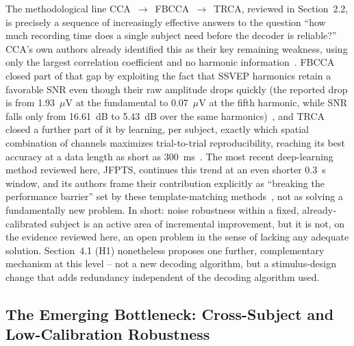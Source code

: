\documentclass[11pt]{article}
\begin{document}
The methodological line CCA~$\rightarrow$~FBCCA~$\rightarrow$~TRCA, reviewed in Section~2.2, is precisely a sequence of increasingly effective answers to the question ``how much recording time does a single subject need before the decoder is reliable?'' CCA's own authors already identified this as their key remaining weakness, using only the largest correlation coefficient and no harmonic information~\cite{lin2007cca}. FBCCA closed part of that gap by exploiting the fact that SSVEP harmonics retain a favorable SNR even though their raw amplitude drops quickly (the reported drop is from 1.93~$\mu$V at the fundamental to 0.07~$\mu$V at the fifth harmonic, while SNR falls only from 16.61~dB to 5.43~dB over the same harmonics)~\cite{chen2015fbcca}, and TRCA closed a further part of it by learning, per subject, exactly which spatial combination of channels maximizes trial-to-trial reproducibility, reaching its best accuracy at a data length as short as 300~ms~\cite{nakanishi2018trca}. The most recent deep-learning method reviewed here, JFPTS, continues this trend at an even shorter 0.3~s window, and its authors frame their contribution explicitly as ``breaking the performance barrier'' set by these template-matching methods~\cite{ding2026jfpts}, not as solving a fundamentally new problem. In short: noise robustness within a fixed, already-calibrated subject is an active area of incremental improvement, but it is not, on the evidence reviewed here, an open problem in the sense of lacking any adequate solution. Section~4.1 (H1) nonetheless proposes one further, complementary mechanism at this level -- not a new decoding algorithm, but a stimulus-design change that adds redundancy independent of the decoding algorithm used.

\subsection{The Emerging Bottleneck: Cross-Subject and Low-Calibration Robustness}
\end{document}
